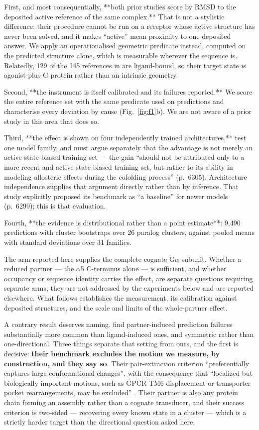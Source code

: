 First, and most consequentially, **both prior studies score by RMSD to the
deposited active reference of the same complex.** That is not a stylistic
difference: their procedure cannot be run on a receptor whose active structure
has never been solved, and it makes ``active'' mean proximity to one deposited
answer. We apply an operationalised geometric predicate instead, computed on the
predicted structure alone, which is measurable wherever the sequence is.
Relatedly, 129 of the 145 references in \citet{chiesa2025templatebias} are
ligand-bound, so their target state is agonist-plus-G protein rather than an
intrinsic geometry.

Second, **the instrument is itself calibrated and its failures reported.** We
score the entire reference set with the same predicate used on predictions and
characterise every deviation by cause (Fig.~\ref{fig:f1}b). We are not aware of a prior
study in this area that does so.

Third, **the effect is shown on four independently trained architectures.**
\citet{chiesa2025templatebias} test one model family, and must argue separately
that the advantage is not merely an active-state-biased training set --- the gain
``should not be attributed only to a more recent and active-state biased training
set, but rather to its ability in modeling allosteric effects during the
cofolding process'' (p.~6305). Architecture independence supplies that argument
directly rather than by inference. That study explicitly proposed its benchmark
as ``a baseline'' for newer models (p.~6299); this is that evaluation.

Fourth, **the evidence is distributional rather than a point estimate**: 9{,}490
predictions with cluster bootstraps over 26 paralog clusters, against pooled
means with standard deviations over 31 families.

The arm reported here supplies the complete cognate G$\alpha$ subunit. Whether a
reduced partner --- the $\alpha$5 C-terminus alone --- is sufficient, and whether
occupancy or sequence identity carries the effect, are separate questions
requiring separate arms; they are not addressed by the experiments below and are
reported elsewhere. What follows establishes the measurement, its calibration
against deposited structures, and the scale and limits of the whole-partner
effect.

A contrary result deserves naming. \citet{ku2026promise} find partner-induced
prediction failures substantially more common than ligand-induced ones, and
symmetric rather than one-directional. Three things separate that setting from
ours, and the first is decisive: \textbf{their benchmark excludes the motion we
measure, by construction, and they say so}. Their pair-extraction criterion
``preferentially captures large conformational changes'', with the consequence
that ``localized but biologically important motions, such as GPCR TM6
displacement or transporter pocket rearrangements, may be excluded''
\citep[p.~9]{ku2026promise}. Their partner is also any protein chain forming an
assembly rather than a cognate transducer, and their success criterion is
two-sided --- recovering every known state in a cluster --- which is a strictly
harder target than the directional question asked here.

